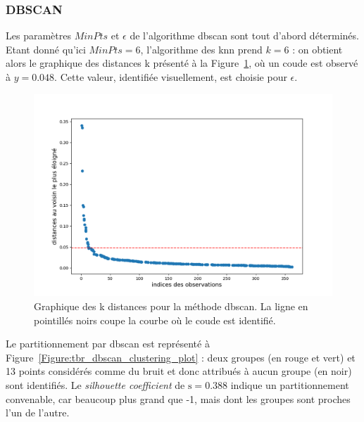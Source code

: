 \subsubsection{DBSCAN}

Les paramètres $MinPts$ et $\epsilon$ de l'algorithme \gls{dbscan} sont tout d'abord déterminés. Etant donné qu'ici $MinPts = 6$, 
l'algorithme des \gls{knn} prend $k = 6$ : on obtient alors le graphique des distances k présenté à la Figure~\ref{Figure:tbr_dbscan_kdistance_plot}, 
où un coude est observé à $y = 0.048$. Cette valeur, identifiée visuellement, est choisie pour $\epsilon$.

\begin{figure}[h!]
  \centering
	\includegraphics[width=0.7\linewidth]{figures/chapter-4/tbr-dbscan-knn-plot} 
  \caption{Graphique des k distances pour la méthode \gls{dbscan}. La ligne en pointillés noirs coupe la courbe où le coude est identifié.}
  \label{Figure:tbr_dbscan_kdistance_plot}
\end{figure}

Le partitionnement par \gls{dbscan} est représenté à Figure~\ref{Figure:tbr_dbscan_clustering_plot} : deux groupes (en rouge et vert) et 13 
points considérés comme du bruit et donc attribués à aucun groupe (en noir) sont identifiés. Le \textit{silhouette coefficient} de $\text{s} = 0.388$
indique un partitionnement convenable, car beaucoup plus grand que -1, mais dont les groupes sont proches l'un de l'autre. 

